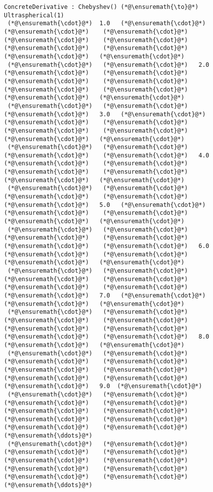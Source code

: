 \documentclass[12pt,landscape]{article}
\begin{document}
{\begin{lstlisting}
ConcreteDerivative : Chebyshev() (*@\ensuremath{\to}@*) Ultraspherical(1)
 (*@\ensuremath{\cdot}@*)  1.0   (*@\ensuremath{\cdot}@*)    (*@\ensuremath{\cdot}@*)    (*@\ensuremath{\cdot}@*)    (*@\ensuremath{\cdot}@*)    (*@\ensuremath{\cdot}@*)    (*@\ensuremath{\cdot}@*)    (*@\ensuremath{\cdot}@*)    (*@\ensuremath{\cdot}@*)   (*@\ensuremath{\cdot}@*)
 (*@\ensuremath{\cdot}@*)   (*@\ensuremath{\cdot}@*)   2.0   (*@\ensuremath{\cdot}@*)    (*@\ensuremath{\cdot}@*)    (*@\ensuremath{\cdot}@*)    (*@\ensuremath{\cdot}@*)    (*@\ensuremath{\cdot}@*)    (*@\ensuremath{\cdot}@*)    (*@\ensuremath{\cdot}@*)   (*@\ensuremath{\cdot}@*)
 (*@\ensuremath{\cdot}@*)   (*@\ensuremath{\cdot}@*)    (*@\ensuremath{\cdot}@*)   3.0   (*@\ensuremath{\cdot}@*)    (*@\ensuremath{\cdot}@*)    (*@\ensuremath{\cdot}@*)    (*@\ensuremath{\cdot}@*)    (*@\ensuremath{\cdot}@*)    (*@\ensuremath{\cdot}@*)   (*@\ensuremath{\cdot}@*)
 (*@\ensuremath{\cdot}@*)   (*@\ensuremath{\cdot}@*)    (*@\ensuremath{\cdot}@*)    (*@\ensuremath{\cdot}@*)   4.0   (*@\ensuremath{\cdot}@*)    (*@\ensuremath{\cdot}@*)    (*@\ensuremath{\cdot}@*)    (*@\ensuremath{\cdot}@*)    (*@\ensuremath{\cdot}@*)   (*@\ensuremath{\cdot}@*)
 (*@\ensuremath{\cdot}@*)   (*@\ensuremath{\cdot}@*)    (*@\ensuremath{\cdot}@*)    (*@\ensuremath{\cdot}@*)    (*@\ensuremath{\cdot}@*)   5.0   (*@\ensuremath{\cdot}@*)    (*@\ensuremath{\cdot}@*)    (*@\ensuremath{\cdot}@*)    (*@\ensuremath{\cdot}@*)   (*@\ensuremath{\cdot}@*)
 (*@\ensuremath{\cdot}@*)   (*@\ensuremath{\cdot}@*)    (*@\ensuremath{\cdot}@*)    (*@\ensuremath{\cdot}@*)    (*@\ensuremath{\cdot}@*)    (*@\ensuremath{\cdot}@*)   6.0   (*@\ensuremath{\cdot}@*)    (*@\ensuremath{\cdot}@*)    (*@\ensuremath{\cdot}@*)   (*@\ensuremath{\cdot}@*)
 (*@\ensuremath{\cdot}@*)   (*@\ensuremath{\cdot}@*)    (*@\ensuremath{\cdot}@*)    (*@\ensuremath{\cdot}@*)    (*@\ensuremath{\cdot}@*)    (*@\ensuremath{\cdot}@*)    (*@\ensuremath{\cdot}@*)   7.0   (*@\ensuremath{\cdot}@*)    (*@\ensuremath{\cdot}@*)   (*@\ensuremath{\cdot}@*)
 (*@\ensuremath{\cdot}@*)   (*@\ensuremath{\cdot}@*)    (*@\ensuremath{\cdot}@*)    (*@\ensuremath{\cdot}@*)    (*@\ensuremath{\cdot}@*)    (*@\ensuremath{\cdot}@*)    (*@\ensuremath{\cdot}@*)    (*@\ensuremath{\cdot}@*)   8.0   (*@\ensuremath{\cdot}@*)   (*@\ensuremath{\cdot}@*)
 (*@\ensuremath{\cdot}@*)   (*@\ensuremath{\cdot}@*)    (*@\ensuremath{\cdot}@*)    (*@\ensuremath{\cdot}@*)    (*@\ensuremath{\cdot}@*)    (*@\ensuremath{\cdot}@*)    (*@\ensuremath{\cdot}@*)    (*@\ensuremath{\cdot}@*)    (*@\ensuremath{\cdot}@*)   9.0  (*@\ensuremath{\cdot}@*)
 (*@\ensuremath{\cdot}@*)   (*@\ensuremath{\cdot}@*)    (*@\ensuremath{\cdot}@*)    (*@\ensuremath{\cdot}@*)    (*@\ensuremath{\cdot}@*)    (*@\ensuremath{\cdot}@*)    (*@\ensuremath{\cdot}@*)    (*@\ensuremath{\cdot}@*)    (*@\ensuremath{\cdot}@*)    (*@\ensuremath{\cdot}@*)   (*@\ensuremath{\ddots}@*)
 (*@\ensuremath{\cdot}@*)   (*@\ensuremath{\cdot}@*)    (*@\ensuremath{\cdot}@*)    (*@\ensuremath{\cdot}@*)    (*@\ensuremath{\cdot}@*)    (*@\ensuremath{\cdot}@*)    (*@\ensuremath{\cdot}@*)    (*@\ensuremath{\cdot}@*)    (*@\ensuremath{\cdot}@*)    (*@\ensuremath{\cdot}@*)   (*@\ensuremath{\ddots}@*)
\end{lstlisting}

}
\end{document}
